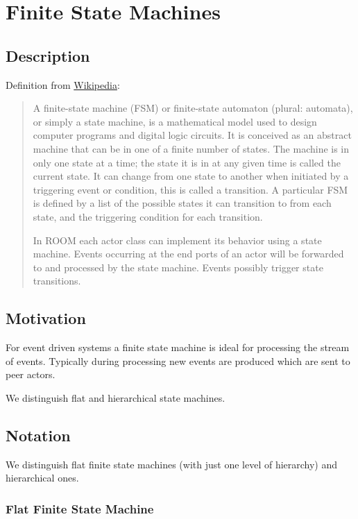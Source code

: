 \section{Finite State Machines}

\subsection{Description}

Definition from \href{http://en.wikipedia.org/wiki/Finite-state\_machine}{Wikipedia}:

\begin{quote}
A finite-state machine (FSM) or finite-state automaton (plural: automata), or simply a state machine, is a 
mathematical model used to design computer programs and digital logic circuits. It is conceived as an 
abstract machine that can be in one of a finite number of states. The machine is in only one state at a 
time; the state it is in at any given time is called the current state. It can change from one state to 
another when initiated by a triggering event or condition, this is called a transition. A particular FSM 
is defined by a list of the possible states it can transition to from each state, and the triggering 
condition for each transition.

In ROOM each actor class can implement its behavior using a state machine. Events occurring at the end 
ports of an actor will be forwarded to and processed by the state machine. Events possibly trigger state 
transitions.
\end{quote}

\subsection{Motivation}

For event driven systems a finite state machine is ideal for processing the stream of events. Typically 
during processing new events are produced which are sent to peer actors.

We distinguish flat and hierarchical state machines.

\subsection{Notation}

We distinguish flat finite state machines (with just one level of hierarchy) and hierarchical ones.

\subsubsection{Flat Finite State Machine}

